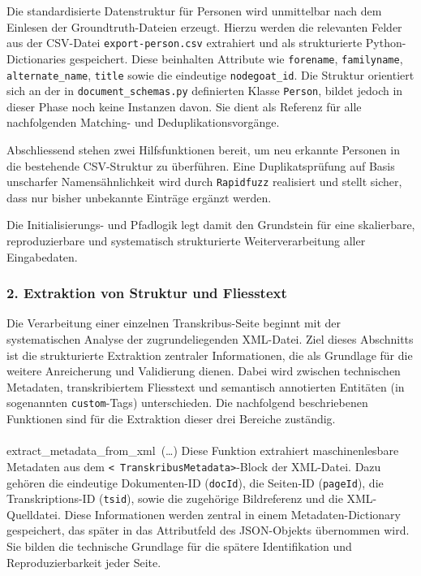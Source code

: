 \documentclass[12pt, a4paper, ngerman, bidi=default]{article}
\makeatletter
\newcommand{\code}[1]{\colorbox{VeryLightGray}{\texttt{#1}}} %
\let\oldparagraph\paragraph%
\renewcommand{\paragraph}{
    \@ifstar%
      \xxxParagraphStar%
      \xxxParagraphNoStar%
 }
\newcommand{\xxxParagraphStar}[1]{\oldparagraph*{#1}\mbox{}}
\newcommand{\xxxParagraphNoStar}[1]{\oldparagraph{#1}\mbox{}}
\makeatother
\begin{document}
Die standardisierte Datenstruktur für Personen wird unmittelbar nach dem Einlesen der 
Groundtruth-Dateien erzeugt. Hierzu werden die relevanten Felder aus der CSV-Datei 
\code{export-person.csv} extrahiert und als strukturierte Python-Dictionaries gespeichert. 
Diese beinhalten Attribute wie \code{forename}, \code{familyname}, \code{alternate\_name}, 
\code{title} sowie die eindeutige \code{nodegoat\_id}. Die Struktur orientiert sich an der in 
\code{document\_schemas.py} definierten Klasse \code{Person}, bildet jedoch in dieser Phase noch 
keine Instanzen davon. Sie dient als Referenz für alle nachfolgenden Matching- und 
Deduplikationsvorgänge.


Abschliessend stehen zwei Hilfsfunktionen bereit, um neu erkannte Personen in die bestehende 
CSV-Struktur zu überführen. Eine Duplikatsprüfung auf Basis unscharfer Namensähnlichkeit wird 
durch \code{Rapidfuzz} realisiert und stellt sicher, dass nur bisher unbekannte Einträge ergänzt werden.

Die Initialisierungs- und Pfadlogik legt damit den Grundstein für eine skalierbare, 
reproduzierbare und systematisch strukturierte Weiterverarbeitung aller Eingabedaten.


\subsubsection*{2. Extraktion von Struktur und Fliesstext}

Die Verarbeitung einer einzelnen Transkribus-Seite beginnt mit der systematischen Analyse der zugrundeliegenden XML-Datei. 
Ziel dieses Abschnitts ist die strukturierte Extraktion zentraler Informationen, die als Grundlage für die weitere Anreicherung 
und Validierung dienen. Dabei wird zwischen technischen Metadaten, transkribiertem Fliesstext und semantisch annotierten Entitäten 
(in sogenannten \code{custom}-Tags) unterschieden. Die nachfolgend beschriebenen Funktionen sind für die Extraktion dieser drei 
Bereiche zuständig.

\paragraph{extract\_metadata\_from\_xml~(\dots)} Diese Funktion extrahiert maschinenlesbare Metadaten aus dem 
\code{< TranskribusMetadata>}-Block der XML-Datei. Dazu gehören die eindeutige Dokumenten-ID (\code{docId}), die Seiten-ID 
(\code{pageId}), die Transkriptions-ID (\code{tsid}), sowie die zugehörige Bildreferenz und die XML-Quelldatei. Diese Informationen 
werden zentral in einem Metadaten-Dictionary gespeichert, das später in das Attributfeld des JSON-Objekts übernommen wird. 
Sie bilden die technische Grundlage für die spätere Identifikation und Reproduzierbarkeit jeder Seite.
\end{document}
